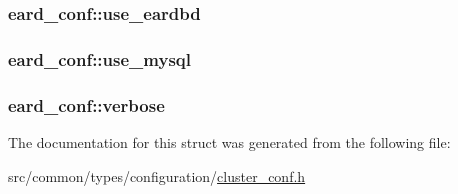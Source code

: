 \subsubsection[{\texorpdfstring{use\+\_\+eardbd}{use_eardbd}}]{ eard\+\_\+conf\+::use\+\_\+eardbd}\hypertarget{structeard__conf_a0fd3d0100036d16c34e38bbd7f7dd8c9}{}\label{structeard__conf_a0fd3d0100036d16c34e38bbd7f7dd8c9}
\subsubsection[{\texorpdfstring{use\+\_\+mysql}{use_mysql}}]{ eard\+\_\+conf\+::use\+\_\+mysql}\hypertarget{structeard__conf_aaf118ac3a724e092f0852499361a66b0}{}\label{structeard__conf_aaf118ac3a724e092f0852499361a66b0}
\subsubsection[{\texorpdfstring{verbose}{verbose}}]{ eard\+\_\+conf\+::verbose}\hypertarget{structeard__conf_ad44edb707601cc0fcdc4e84fc2fed141}{}\label{structeard__conf_ad44edb707601cc0fcdc4e84fc2fed141}


The documentation for this struct was generated from the following file\+:\begin{DoxyCompactItemize}
\item 
src/common/types/configuration/\hyperlink{cluster__conf_8h}{cluster\+\_\+conf.\+h}\end{DoxyCompactItemize}
